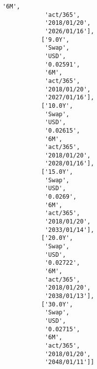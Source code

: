 \documentclass[11pt]{article}
\begin{document}
\begin{Verbatim}[commandchars=\\\{\}]
            '6M',
            'act/365',
            '2018/01/20',
            '2026/01/16'],
           ['9.0Y',
            'Swap',
            'USD',
            '0.02591',
            '6M',
            'act/365',
            '2018/01/20',
            '2027/01/16'],
           ['10.0Y',
            'Swap',
            'USD',
            '0.02615',
            '6M',
            'act/365',
            '2018/01/20',
            '2028/01/16'],
           ['15.0Y',
            'Swap',
            'USD',
            '0.0269',
            '6M',
            'act/365',
            '2018/01/20',
            '2033/01/14'],
           ['20.0Y',
            'Swap',
            'USD',
            '0.02722',
            '6M',
            'act/365',
            '2018/01/20',
            '2038/01/13'],
           ['30.0Y',
            'Swap',
            'USD',
            '0.02715',
            '6M',
            'act/365',
            '2018/01/20',
            '2048/01/11']]
\end{Verbatim}
            
\end{document}
